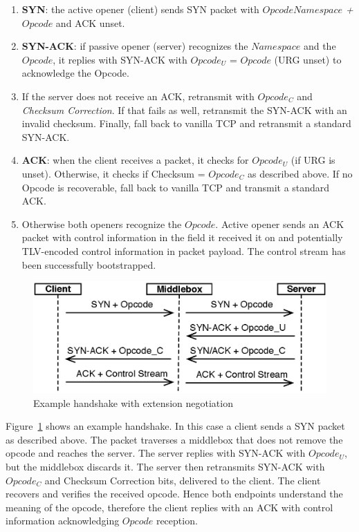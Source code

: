 \documentclass{sig-alternate-10pt}
\begin{document}
\begin{enumerate}
\item \textbf{SYN}: the active opener (client) sends SYN packet with \emph{$Opcode Namespace$ + $Opcode$} and ACK unset.
\item \textbf{SYN-ACK}: if passive opener (server) recognizes the  $Namespace$ and the $Opcode$, it replies with SYN-ACK with $Opcode_U$ = $Opcode$ (URG unset) to acknowledge the Opcode.
\item If the server does not receive an ACK, retransmit with $Opcode_C$ and \emph{Checksum Correction}. If that fails as well, retransmit the SYN-ACK with an invalid checksum. Finally, fall back to vanilla TCP and retransmit a standard SYN-ACK.
\item \textbf{ACK}: when the client receives a packet, it checks for $Opcode_U$ (if URG is unset). Otherwise, it checks if Checksum = $Opcode_C$ as described above. If no Opcode is recoverable, fall back to vanilla TCP and transmit a standard ACK.
\item Otherwise both openers recognize the $Opcode$. Active opener sends an ACK packet with control information in the field it received it on and potentially TLV-encoded control information in packet payload. The control stream has been successfully bootstrapped.
\end{enumerate}

\begin{figure}[t!]
\centering
\includegraphics[width=.9\columnwidth]{figs/handshake}
\caption{Example handshake with extension negotiation}
\label{fig:handshake}
\end{figure}

Figure~\ref{fig:handshake} shows an example handshake. In this case a client sends a SYN packet as described above. The packet traverses a middlebox that does not remove the opcode and reaches the server. The server replies with SYN-ACK with $Opcode_U$, but the middlebox discards it. The server then retransmits SYN-ACK with $Opcode_C$ and Checksum Correction bits, delivered to the client. The client recovers and verifies the received opcode. Hence both endpoints understand the meaning of the opcode, therefore the client replies with an ACK with control information acknowledging $Opcode$ reception.
\end{document}

